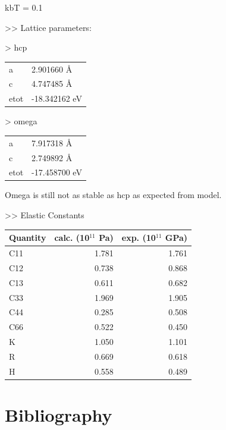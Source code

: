 \documentclass[11pt]{article}
\begin{document}
kbT = 0.1

>> Lattice parameters:

> hcp
\begin{center}
\begin{tabular}{ll}
a & 2.901660  \AA{}\\
c & 4.747485  \AA{}\\
etot & -18.342162  eV\\
\end{tabular}
\end{center}

> omega
\begin{center}
\begin{tabular}{ll}
a & 7.917318  \AA{}\\
c & 2.749892 \AA{}\\
etot & -17.458700 eV\\
\end{tabular}
\end{center}

Omega is still not as stable as hcp as expected from model. 


>> Elastic Constants

\begin{center}
\begin{tabular}{lrr}
Quantity & calc. (10\(^{\text{11}}\) Pa) & exp. (10\(^{\text{11}}\) GPa)\\
\hline
C11 & 1.781 & 1.761\\
C12 & 0.738 & 0.868\\
C13 & 0.611 & 0.682\\
C33 & 1.969 & 1.905\\
C44 & 0.285 & 0.508\\
C66 & 0.522 & 0.450\\
K & 1.050 & 1.101\\
R & 0.669 & 0.618\\
H & 0.558 & 0.489\\
\end{tabular}
\end{center}

\section{Bibliography}
\label{sec:org42ffa28}
\label{org8601199}



\end{document}
